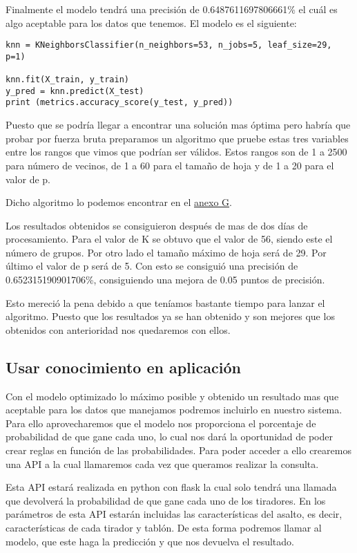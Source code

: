 Finalmente el modelo tendrá una precisión de 0.6487611697806661\% el cuál es algo
aceptable para los datos que tenemos. El modelo es el siguiente:

\begin{lstlisting}
knn = KNeighborsClassifier(n_neighbors=53, n_jobs=5, leaf_size=29, p=1)

knn.fit(X_train, y_train)
y_pred = knn.predict(X_test)
print (metrics.accuracy_score(y_test, y_pred))
\end{lstlisting}

Puesto que se podría llegar a encontrar una solución mas óptima pero habría que probar
por fuerza bruta preparamos un algoritmo que pruebe estas tres variables entre los rangos
que vimos que podrían ser válidos. Estos rangos son de 1 a 2500 para número de vecinos,
de 1 a 60 para el tamaño de hoja y de 1 a 20 para el valor de p.

Dicho algoritmo lo podemos encontrar en el \hyperref[cap:Algoritmo valores KNN]{anexo G}.

Los resultados obtenidos se consiguieron después de mas de dos días de procesamiento.
Para el valor de K se obtuvo que el valor de 56, siendo este el número de grupos. Por otro lado
el tamaño máximo de hoja será de 29. Por último el valor de p será de 5. Con esto se consiguió
una precisión de 0.652315190901706\%, consiguiendo una mejora de 0.05 puntos de precisión.

Esto mereció la pena debido a que teníamos bastante tiempo para lanzar el algoritmo. Puesto que
los resultados ya se han obtenido y son mejores que los obtenidos con anterioridad nos
quedaremos con ellos.

\subsection{Usar conocimiento en aplicación}

Con el modelo optimizado lo máximo posible y obtenido un resultado mas que aceptable
para los datos que manejamos podremos incluirlo en nuestro sistema. Para ello aprovecharemos
que el modelo nos proporciona el porcentaje de probabilidad de que gane cada uno, lo cual nos
dará la oportunidad de poder crear reglas en función de las probabilidades. Para poder acceder
a ello crearemos una API a la cual llamaremos cada vez que queramos realizar la consulta.

Esta API estará realizada en python con flask la cual solo tendrá una llamada que devolverá
la probabilidad de que gane cada uno de los tiradores. En los parámetros de esta API estarán
incluidas las características del asalto, es decir, características de cada tirador y tablón.
De esta forma podremos llamar al modelo, que este haga la predicción y que nos
devuelva el resultado.

